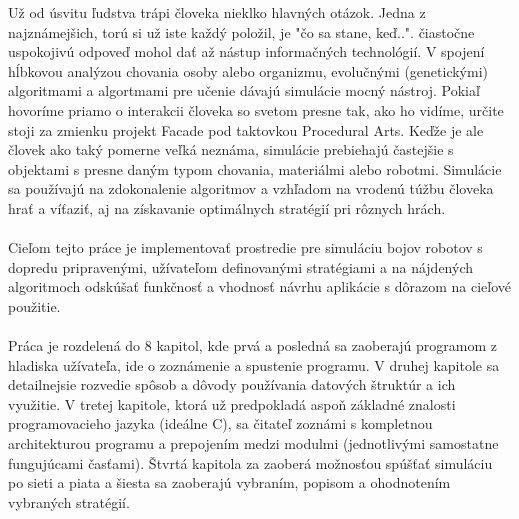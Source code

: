 \indent Už od úsvitu ľudstva trápi človeka nieklko hlavných otázok. Jedna z najznámejšich, torú si už iste každý položil, je "čo sa stane, keď..". čiastočne uspokojivú odpoveď mohol dať až nástup informačných technológií. V spojení hĺbkovou analýzou chovania osoby alebo organizmu, evolučnými (genetickými) algoritmami a algortmami pre učenie dávajú simulácie mocný nástroj. Pokiaľ hovoríme priamo o interakcii človeka so svetom presne tak, ako ho vidíme, určite stoji za zmienku projekt Facade pod taktovkou Procedural Arts. Keďže je ale človek ako taký pomerne veľká neznáma, simulácie prebiehajú častejšie s objektami s presne daným typom chovania, materiálmi alebo robotmi. Simulácie sa používajú na zdokonalenie algoritmov a vzhľadom na vrodenú túžbu človeka hrať a víťaziť, aj na získavanie optimálnych stratégií pri rôznych hrách. \\\\
\indent Cieľom tejto práce je implementovať prostredie pre simuláciu bojov robotov s dopredu pripravenými, užívateľom definovanými stratégiami a na nájdených algoritmoch odskúšať funkčnosť a vhodnosť návrhu aplikácie s dôrazom na cieľové použitie. \\\\
\indent Práca je rozdelená do 8 kapitol, kde prvá a posledná sa zaoberajú programom z hladiska užívateľa, ide o zoznámenie a spustenie programu. V druhej kapitole sa detailnejsie rozvedie spôsob a dôvody používania datových štruktúr a ich využitie. V tretej kapitole, ktorá už predpokladá aspoň základné znalosti programovacieho jazyka (ideálne C), sa čitateľ zoznámi s kompletnou architekturou programu a prepojením medzi modulmi (jednotlivými samostatne fungujúcami časťami). Štvrtá kapitola za zaoberá možnosťou spúšťať simuláciu po sieti a piata a šiesta sa zaoberajú vybraním, popisom a ohodnotením vybraných stratégií.
